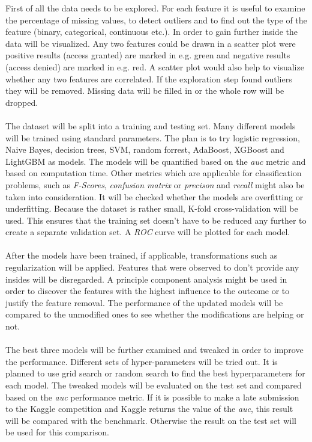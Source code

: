 \documentclass[11pt]{article}
\begin{document}
First of all the data needs to be explored. For each feature it is useful to examine the 
percentage of missing values, to detect outliers and to find out the type of the 
feature (binary, categorical, continuous etc.). 
In order to gain further inside the data will be visualized. Any two features could be drawn 
in a scatter plot were positive results (access granted) are marked in e.g. green and negative 
results (access denied) are marked in e.g. red.
A scatter plot would also help to visualize whether any two features are correlated.
If the exploration step found outliers they will be removed. Missing data will be filled in or
the whole row will be dropped. 
\\ \\
The dataset will be split into a training and testing set.
Many different models will be trained using standard parameters. 
The plan is to try logistic regression, Naive Bayes, decision trees, SVM,
random forrest, AdaBoost, XGBoost and LightGBM as models.
The models will be quantified based on the {\it auc} metric and based on computation time.
Other metrics which are applicable for classification problems, 
such as {\it F-Scores}, {\it confusion matrix} or {\it precison} and {\it recall} might also be 
taken into consideration. It will be checked whether the models are overfitting or underfitting.
Because the dataset is rather small, K-fold cross-validation 
will be used. This ensures that the training set doesn't have to be reduced any further to 
create a separate validation set.
A {\it ROC} curve will be plotted for each model.
\\ \\
After the models have been trained, if applicable, transformations 
such as regularization will be applied. Features that were observed to don't provide any 
insides will be disregarded. A principle component analysis might be used in order to 
discover the features with the highest influence to the outcome or to justify 
the feature removal. The performance of the updated models will be compared to the unmodified ones
to see whether the modifications are helping or not.
\\ \\
The best three models will be further examined and tweaked in order to improve the performance. 
Different sets of hyper-parameters will be tried out. It is planned to use grid search or 
random search to find the best hyperparameters for each model. The tweaked models will be evaluated on the test set
and compared based on the {\it auc} performance metric.
If it is possible to make a late submission to the Kaggle competition and Kaggle returns the 
value of the {\it auc}, this result will be compared with the benchmark. Otherwise the result on the
test set will be used for this comparison.
\end{document}
